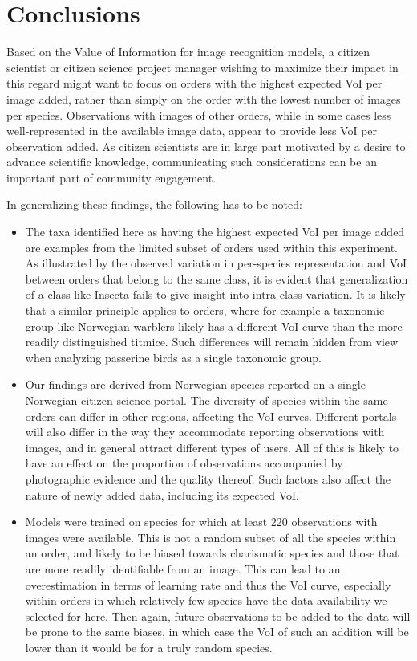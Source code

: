\documentclass{article}
\begin{document}
\section*{Conclusions}
Based on the Value of Information for image recognition models, a citizen scientist or citizen science project manager wishing to maximize their impact in this regard might want to focus on orders with the highest expected VoI per image added, rather than simply on the order with the lowest number of images per species. Observations with images of other orders, while in some cases less well-represented in the available image data, appear to provide less VoI per observation added. As citizen scientists are in large part motivated by a desire to advance scientific knowledge\autocite{Richter2021}, communicating such considerations can be an important part of community engagement.

In generalizing these findings, the following has to be noted:
\begin{itemize}
\item The taxa identified here as having the highest expected VoI per image added are examples from the limited subset of orders used within this experiment. As illustrated by the observed variation in per-species representation and VoI between orders that belong to the same class, it is evident that generalization of a class like Insecta fails to give insight into intra-class variation. It is likely that a similar principle applies to orders, where for example a taxonomic group like Norwegian warblers likely has a different VoI curve than the more readily distinguished titmice. Such differences will remain hidden from view when analyzing passerine birds as a single taxonomic group.
\item Our findings are derived from Norwegian species reported on a single Norwegian citizen science portal. The diversity of species within the same orders can differ in other regions, affecting the VoI curves. Different portals will also differ in the way they accommodate reporting observations with images, and in general attract different types of users\autocite{Boakes2016}. All of this is likely to have an effect on the proportion of observations accompanied by photographic evidence and the quality thereof. Such factors also affect the nature of newly added data, including its expected VoI.
\item Models were trained on species for which at least 220 observations with images were available. This is not a random subset of all the species within an order, and likely to be biased towards charismatic species and those that are more readily identifiable from an image. This can lead to an overestimation in terms of learning rate and thus the VoI curve, especially within orders in which relatively few species have the data availability we selected for here. Then again, future observations to be added to the data will be prone to the same biases, in which case the VoI of such an addition will be lower than it would be for a truly random species.
\end{itemize}
\end{document}
